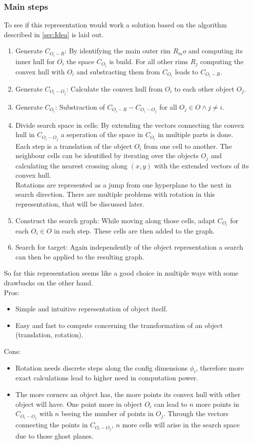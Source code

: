\subsubsection{Main steps}
To see if this representation would work a solution based on the algorithm described in \ref{sec:Idea} is laid out.
\begin{enumerate}
\item Generate $C_{O_i-R}$: By identifying the main outer rim $R_mo$ and computing its inner hull for $O_i$ the space $C_{O_i}$ is build. For all other rims $R_j$ computing the convex hull with $O_i$ and substracting them from $C_{O_i}$ leads to $C_{O_i-R}$.
\item Generate $C_{O_i-O_j}$: Calculate the convex hull from $O_i$ to each other object $O_j$.
\item Generate $C_{O_i}$: Substraction of $C_{O_i-R} - C_{O_i-O_j}$ for all $O_j \in O \wedge j \neq i$.
\item Divide search space in cells: By extending the vectors connecting the convex hull in $C_{O_i-O_j}$  a seperation of the space in $C_{O_i}$ in multiple parts is done. Each step is a translation of the object $O_i$  from one cell to another. The neighbour cells can be identified by iterating over the objects $O_j$ and calculating the nearest crossing along $(x,y)$ with the extended vectors of its convex hull. \\ Rotations are represented as a jump from one hyperplane to the next in search direction. There are multiple problems with rotation in this representation, that will be discussed later.
\item Construct the search graph: While moving along those cells, adapt $C_{O_i}$ for each $O_i \in O$ in each step. These cells are then added to the graph.
\item Search for target: Again independently of the object representation a search can then be applied to the resulting graph. 
\end{enumerate}


So far this representation seems like a good choice in multiple ways with some drawbacks on the other hand.\\
Pros:
\begin{itemize}
\item Simple and intuitive representation of object itself.
\item Easy and fast to compute concerning the transformation of an object (translation, rotation).
\end{itemize}
Cons:
\begin{itemize}
\item Rotation needs discrete steps along the config dimensions $\phi_i$, therefore more exact calculations lead to higher need in computation power.
\item The more corners an object has, the more points its convex hull with other object will have. One point more in object $O_i$ can lead to $n$ more points in $C_{O_i-O_j}$ with $n$ beeing the number of points in $O_j$. Through the vectors connecting the points in $C_{O_i-O_j}$, $n$ more cells will arise in the search space due to those ghost planes.
\end{itemize}

